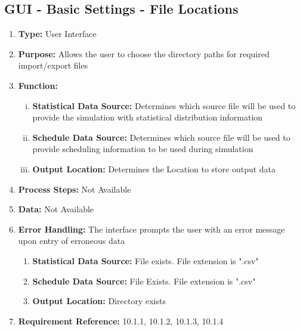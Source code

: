\documentclass[paper=letter, fontsize=10pt]{scrartcl}
\numberwithin{equation}{section}		%
\numberwithin{figure}{section}			%
\numberwithin{table}{section}				%
\begin{document}
\subsection{GUI - Basic Settings - File Locations}
\begin{enumerate}[]
	\item \textbf{Type:} User Interface
	\item \textbf{Purpose:} Allows the user to choose the directory paths for required import/export files
	\item \textbf{Function:} 
	\begin{enumerate}[(i)]
		\item \textbf{Statistical Data Source:} Determines which source file will be used to provide the simulation with statistical distribution information
		\item \textbf{Schedule Data Source:} Determines which source file will be used to provide scheduling information to be used during simulation
		\item \textbf{Output Location:} Determines the Location to store output data
	\end{enumerate}
	\item \textbf{Process Steps:} Not Available
	\item \textbf{Data:} Not Available
	\item \textbf{Error Handling:} The interface prompts the user with an error message upon entry of erroneous data
	\begin{enumerate}[]
		\item \textbf{Statistical Data Source:} File exists. File extension is ".csv"
		\item \textbf{Schedule Data Source:} File Exists. File extension is ".csv"
		\item \textbf{Output Location:} Directory exists
	\end{enumerate}
	\item \textbf{Requirement Reference:} 10.1.1, 10.1.2, 10.1.3, 10.1.4
\end{enumerate}
\end{document}
